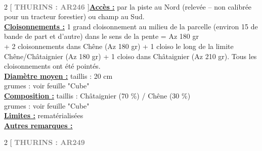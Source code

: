 \documentclass[a4paper,openany]{book}\usepackage[]{graphicx}\usepackage[]{color}
\begin{document}
\\\begin{multicols}{2}
[
\textbf{\textcolor{gray}{
\large THURINS : AR246
}}
]\noindent\textbf{\underline{Accès :}} par la piste au Nord (relevée -- non calibrée pour un tracteur forestier) ou champ au Sud.\vspace{0.1cm} \\\noindent\textbf{\underline{Cloisonnements :}} 1 grand cloisonnement au milieu de la parcelle (environ 15 de bande de part et d'autre) dans le sens de la pente = Az 180 gr \\ + 2 cloisonnements dans Chêne (Az 180 gr) + 1 cloiso le long de la limite Chêne/Châtaignier (Az 180 gr) + 1 cloiso dans Châtaignier (Az 210 gr). Tous les cloisonnements ont été pointés.\vspace{0.1cm} \\\noindent\textbf{\underline{Diamètre moyen :}} taillis : 20 cm \\ grumes : voir feuille "Cube"\vspace{0.1cm} \\\noindent\textbf{\underline{Composition :}} taillis : Châtaignier (70 \%) / Chêne (30 \%) \\ grumes : voir feuille "Cube"\vspace{0.1cm} \\\noindent\textbf{\underline{Limites :}} rematérialisées\vspace{0.1cm} \\\noindent\textbf{\underline{Autres remarques :}} \vspace{0.1cm} \\\end{multicols}\begin{multicols}{2}
[
\textbf{\textcolor{gray}{
\large THURINS : AR249
}}

\end{multicols}
\end{document}
